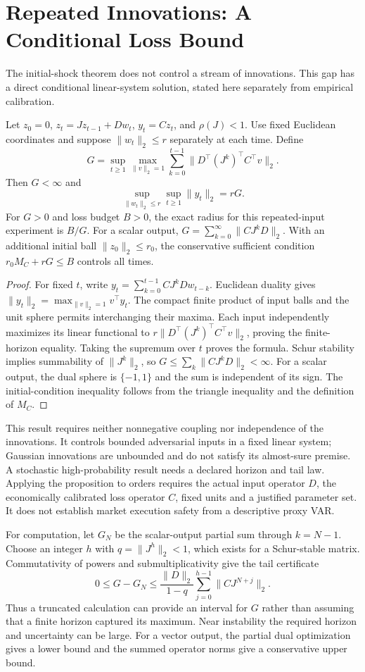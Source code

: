 \section{Repeated Innovations: A Conditional Loss Bound}
The initial-shock theorem does not control a stream of innovations. This gap has a direct conditional linear-system solution, stated here separately from empirical calibration.
\begin{proposition}
Let $z_0=0$, $z_t=Jz_{t-1}+Dw_t$, $y_t=Cz_t$, and $\rho(J)<1$. Use fixed Euclidean coordinates and suppose $\|w_t\|_2\le r$ separately at each time. Define
\[
G=\sup_{t\ge1}\max_{\|v\|_2=1}
\sum_{k=0}^{t-1}\|D^\top(J^k)^\top C^\top v\|_2.
\]
Then $G<\infty$ and
\[
\sup_{\|w_t\|_2\le r}\sup_{t\ge1}\|y_t\|_2=rG.
\]
For $G>0$ and loss budget $B>0$, the exact radius for this repeated-input experiment is $B/G$. For a scalar output, $G=\sum_{k=0}^\infty\|CJ^kD\|_2$. With an additional initial ball $\|z_0\|_2\le r_0$, the conservative sufficient condition $r_0 M_C+rG\le B$ controls all times.
\end{proposition}
\begin{proof}
For fixed $t$, write $y_t=\sum_{k=0}^{t-1}CJ^kDw_{t-k}$. Euclidean duality gives $\|y_t\|_2=\max_{\|v\|_2=1}v^\top y_t$. The compact finite product of input balls and the unit sphere permits interchanging their maxima. Each input independently maximizes its linear functional to $r\|D^\top(J^k)^\top C^\top v\|_2$, proving the finite-horizon equality. Taking the supremum over $t$ proves the formula. Schur stability implies summability of $\|J^k\|_2$, so $G\le\sum_k\|CJ^kD\|_2<\infty$. For a scalar output, the dual sphere is $\{-1,1\}$ and the sum is independent of its sign. The initial-condition inequality follows from the triangle inequality and the definition of $M_C$.
\end{proof}

This result requires neither nonnegative coupling nor independence of the innovations. It controls bounded adversarial inputs in a fixed linear system; Gaussian innovations are unbounded and do not satisfy its almost-sure premise. A stochastic high-probability result needs a declared horizon and tail law. Applying the proposition to orders requires the actual input operator $D$, the economically calibrated loss operator $C$, fixed units and a justified parameter set. It does not establish market execution safety from a descriptive proxy VAR.

For computation, let $G_N$ be the scalar-output partial sum through $k=N-1$. Choose an integer $h$ with $q=\|J^h\|_2<1$, which exists for a Schur-stable matrix. Commutativity of powers and submultiplicativity give the tail certificate
\[
0\le G-G_N\le
\frac{\|D\|_2}{1-q}\sum_{j=0}^{h-1}\|CJ^{N+j}\|_2.
\]
Thus a truncated calculation can provide an interval for $G$ rather than assuming that a finite horizon captured its maximum. Near instability the required horizon and uncertainty can be large. For a vector output, the partial dual optimization gives a lower bound and the summed operator norms give a conservative upper bound.

